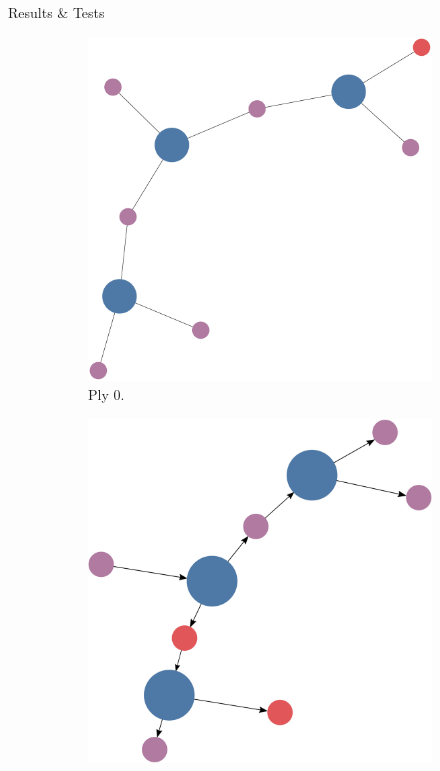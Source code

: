 \documentclass[final]{beamer} %
\begin{document}
\begin{frame}
\begin{columns}
\begin{column}{.33\textwidth}
{\begin{block}{Results \& Tests}
					\begin{figure}[!htb]
						\centering
						\begin{subfigure}[!htb]{0.32\columnwidth}
							\centering
							\includegraphics[width=\columnwidth]{figures/knn_simple_backward_think_0.pdf}
							\caption{Ply 0.}
						\end{subfigure}
						\begin{subfigure}[!htb]{0.32\columnwidth}
							\centering
							\includegraphics[width=\columnwidth]{figures/knn_simple_backward_think_1.pdf}

\end{subfigure}
\end{figure}
\end{block}}
\end{column}
\end{columns}
\end{frame}
\end{document}
